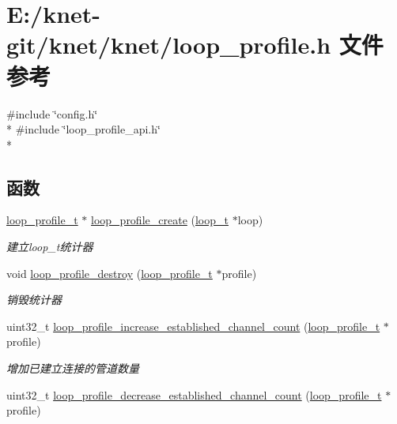 \hypertarget{a00078}{}\section{E\+:/knet-\/git/knet/knet/loop\+\_\+profile.h 文件参考}
\label{a00078}
{\ttfamily \#include \char`\"{}config.\+h\char`\"{}}\\*
{\ttfamily \#include \char`\"{}loop\+\_\+profile\+\_\+api.\+h\char`\"{}}\\*
\subsection*{函数}
\begin{DoxyCompactItemize}
\item 
\hyperlink{a00050_ad060e1396346d2f5db1ec0597376a107_ad060e1396346d2f5db1ec0597376a107}{loop\+\_\+profile\+\_\+t} $\ast$ \hyperlink{a00078_adb276ec4e5559b1e167dc9045fa499bb_adb276ec4e5559b1e167dc9045fa499bb}{loop\+\_\+profile\+\_\+create} (\hyperlink{a00050_a9c3ad1cd2de83e09f3a7b59fa82c94ee_a9c3ad1cd2de83e09f3a7b59fa82c94ee}{loop\+\_\+t} $\ast$loop)
\begin{DoxyCompactList}\small\item\em 建立loop\+\_\+t统计器 \end{DoxyCompactList}\item 
void \hyperlink{a00078_a737f9f904afe15e70f56886c44372e5d_a737f9f904afe15e70f56886c44372e5d}{loop\+\_\+profile\+\_\+destroy} (\hyperlink{a00050_ad060e1396346d2f5db1ec0597376a107_ad060e1396346d2f5db1ec0597376a107}{loop\+\_\+profile\+\_\+t} $\ast$profile)
\begin{DoxyCompactList}\small\item\em 销毁统计器 \end{DoxyCompactList}\item 
uint32\+\_\+t \hyperlink{a00078_af388f071a9558df8049c51205d33361a_af388f071a9558df8049c51205d33361a}{loop\+\_\+profile\+\_\+increase\+\_\+established\+\_\+channel\+\_\+count} (\hyperlink{a00050_ad060e1396346d2f5db1ec0597376a107_ad060e1396346d2f5db1ec0597376a107}{loop\+\_\+profile\+\_\+t} $\ast$profile)
\begin{DoxyCompactList}\small\item\em 增加已建立连接的管道数量 \end{DoxyCompactList}\item 
uint32\+\_\+t \hyperlink{a00078_a7cfc0ba3d4b5083413f330b519e38eec_a7cfc0ba3d4b5083413f330b519e38eec}{loop\+\_\+profile\+\_\+decrease\+\_\+established\+\_\+channel\+\_\+count} (\hyperlink{a00050_ad060e1396346d2f5db1ec0597376a107_ad060e1396346d2f5db1ec0597376a107}{loop\+\_\+profile\+\_\+t} $\ast$profile)

\end{DoxyCompactItemize}
